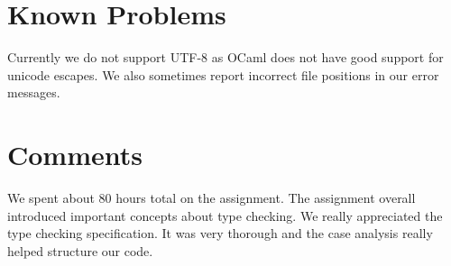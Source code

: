 \documentclass{hw}
\begin{document}
\section{Known Problems}\label{sec:problems}
Currently we do not support UTF-8 as OCaml does not have good support for
unicode escapes. We also sometimes report incorrect file positions in our error
messages.

\section{Comments}\label{sec:comments}
We spent about 80 hours total on the assignment. The assignment overall
introduced important concepts about type checking. We really appreciated
the type checking specification. It was very thorough and the case analysis
really helped structure our code.
\end{document}
